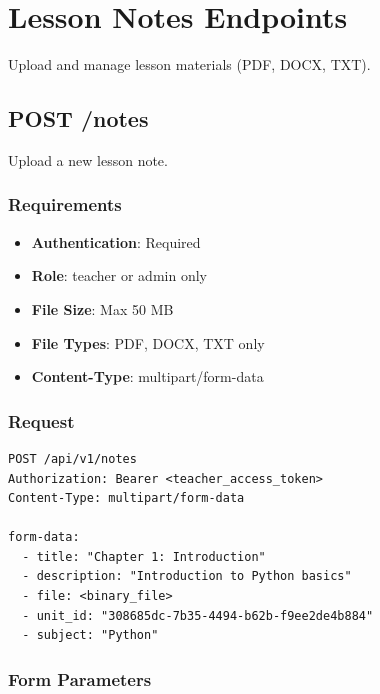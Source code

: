 \documentclass[12pt,a4paper,oneside]{article}
\begin{document}
\newpage

\section{Lesson Notes Endpoints}

Upload and manage lesson materials (PDF, DOCX, TXT).

\subsection{POST /notes}

Upload a new lesson note.

\subsubsection{Requirements}

\begin{itemize}
    \item \textbf{Authentication}: Required
    \item \textbf{Role}: teacher or admin only
    \item \textbf{File Size}: Max 50 MB
    \item \textbf{File Types}: PDF, DOCX, TXT only
    \item \textbf{Content-Type}: multipart/form-data
\end{itemize}

\subsubsection{Request}

\begin{lstlisting}
POST /api/v1/notes
Authorization: Bearer <teacher_access_token>
Content-Type: multipart/form-data

form-data:
  - title: "Chapter 1: Introduction"
  - description: "Introduction to Python basics"
  - file: <binary_file>
  - unit_id: "308685dc-7b35-4494-b62b-f9ee2de4b884"
  - subject: "Python"
\end{lstlisting}

\subsubsection{Form Parameters}
\end{document}
